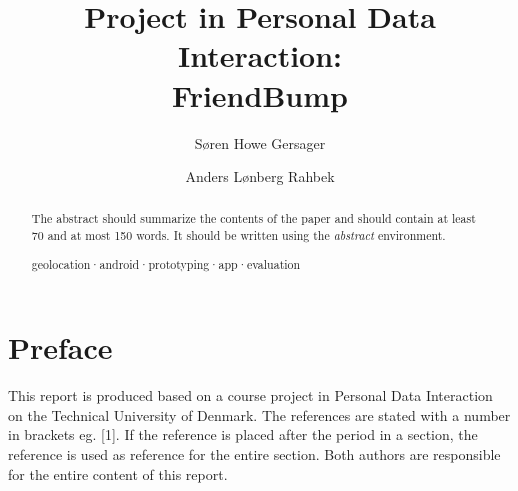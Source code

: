 \documentclass[runningheads,a4paper]{llncs}
\newcommand{\keywords}[1]{\par\addvspace\baselineskip
\noindent\keywordname\enspace\ignorespaces#1}
\begin{document}
\mainmatter  %

\title{Project in Personal Data Interaction:\\FriendBump}


%
%
\author{S\o ren Howe Gersager \and Anders L\o nberg Rahbek}
%


%
%

\maketitle


\begin{abstract}
The abstract should summarize the contents of the paper and should
contain at least 70 and at most 150 words. It should be written using the
\emph{abstract} environment.
\keywords{geolocation·android·prototyping·app·evaluation}
\end{abstract}


\section*{Preface}
This report is produced based on a course project in Personal Data Interaction on the Technical University of Denmark. The references are stated with a number in brackets eg. [1]. If the reference is placed after the period in a section, the reference is used as reference for the entire section. 
Both authors are responsible for the entire content of this report.
\end{document}
